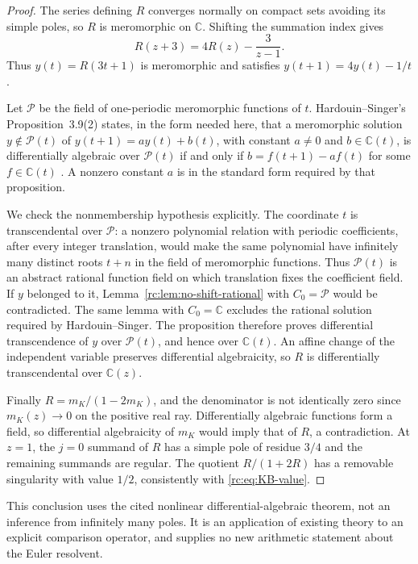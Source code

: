 \documentclass[11pt,a4paper]{article}
\theoremstyle{definition}
\theoremstyle{remark}
\theoremstyle{plain}
\numberwithin{equation}{section}
\providecommand{\rcC}{\mathbb C}
\begin{document}
\begin{proof}
The series defining $R$ converges normally on compact sets avoiding its
simple poles, so $R$ is meromorphic on $\rcC$.  Shifting the summation
index gives
\[
 R(z+3)=4R(z)-\frac3{z-1}.
\]
Thus $y(t)=R(3t+1)$ is meromorphic and satisfies
$y(t+1)=4y(t)-1/t$.

Let $\mathcal P$ be the field of one-periodic meromorphic functions of
$t$.  Hardouin--Singer's Proposition~3.9(2) states, in the form needed
here, that a meromorphic solution $y\notin\mathcal P(t)$ of
$y(t+1)=ay(t)+b(t)$, with constant $a\ne0$ and $b\in\rcC(t)$,
is differentially algebraic over $\mathcal P(t)$ if and only if
$b=f(t+1)-af(t)$ for some $f\in\rcC(t)$
\cite[Proposition 3.9(2)]{rc:hardouin-singer}.  A nonzero constant $a$
is in the standard form required by that proposition.

We check the nonmembership hypothesis explicitly.  The coordinate $t$
is transcendental over $\mathcal P$: a nonzero polynomial relation with
periodic coefficients, after every integer translation, would make the
same polynomial have infinitely many distinct roots $t+n$ in the field
of meromorphic functions.  Thus $\mathcal P(t)$ is an abstract rational
function field on which translation fixes the coefficient field.  If
$y$ belonged to it, Lemma~\ref{rc:lem:no-shift-rational} with
$C_0=\mathcal P$ would be contradicted.  The same lemma with
$C_0=\rcC$ excludes the rational solution required by
Hardouin--Singer.  The proposition therefore proves differential
transcendence of $y$ over $\mathcal P(t)$, and hence over $\rcC(t)$.
An affine change of the independent variable preserves differential
algebraicity, so $R$ is differentially transcendental over $\rcC(z)$.

Finally $R=m_K/(1-2m_K)$, and the denominator is not identically zero
since $m_K(z)\to0$ on the positive real ray.  Differentially algebraic
functions form a field, so differential algebraicity of $m_K$ would
imply that of $R$, a contradiction.  At $z=1$, the $j=0$ summand of
$R$ has a simple pole of residue $3/4$ and the remaining summands are
regular.  The quotient $R/(1+2R)$ has a removable singularity with
value $1/2$, consistently with \eqref{rc:eq:KB-value}.
\end{proof}

This conclusion uses the cited nonlinear differential-algebraic theorem,
not an inference from infinitely many poles.  It is an application of
existing theory to an explicit comparison operator, and supplies no new
arithmetic statement about the Euler resolvent.
\end{document}
